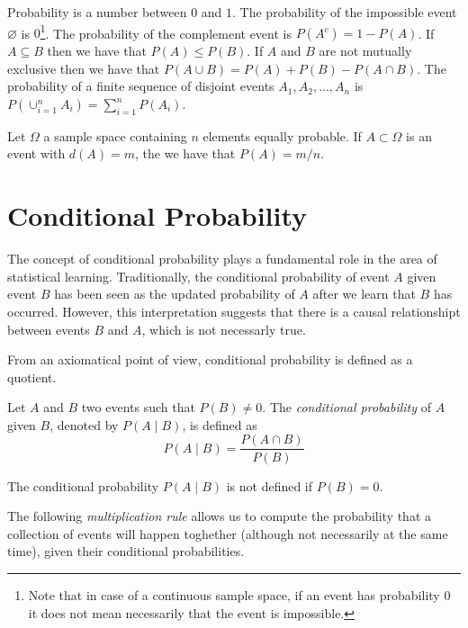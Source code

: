\medskip

Probability is a number between $0$ and $1$. The probability of the impossible event $\varnothing$ is $0$\footnote{Note that in case of a continuous sample space, if an event has probability $0$ it does not mean necessarily that the event is impossible.}. The probability of the complement event is $P(A^c) = 1 - P(A)$. If $A \subseteq B$ then we have that $P(A) \leq P(B)$. If $A$ and $B$ are not mutually exclusive then we have that $P(A \cup B) = P(A) + P(B) - P(A \cap B)$. The probability of a finite sequence of disjoint events $A_1, A_2, \ldots, A_n$ is $P(\cup_{i=1}^n A_i) = \sum_{i=1}^n P(A_i)$.

\begin{example}
Let $\Omega$ a sample space containing $n$ elements equally probable. If $A \subset \Omega$ is an event with $d(A) = m$, the we have that $P(A) = m/n$.
\end{example}


%
%

\section{Conditional Probability}
\label{sec:probability_conditional}

The concept of conditional probability plays a fundamental role in the area of statistical learning. Traditionally, the conditional probability of event $A$ given event $B$ has been seen as the updated probability of $A$ after we learn that $B$ has occurred. However, this interpretation suggests that there is a causal relationshipt between events $B$ and $A$, which is not necessarly true.

From an axiomatical point of view, conditional probability is defined as a quotient.

\begin{definition}
Let $A$ and $B$ two events such that $P \left( B \right) \neq 0$. The \emph{conditional probability} of $A$ given $B$, denoted by $P\left(A\mid B\right)$, is defined as
\[
P\left(A\mid B\right) = \frac{P\left(A\cap B\right)}{P\left(B\right)}
\]
\end{definition}

The conditional probability $P\left(A\mid B\right)$ is not defined if $P\left(B\right)=0$.

The following \emph{multiplication rule} allows us to compute the probability that a collection of events will happen toghether (although not necessarily at the same time), given their conditional probabilities.

